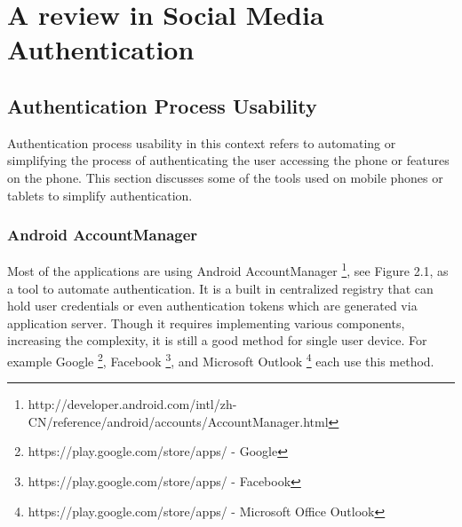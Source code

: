 
\chapter{A review in Social Media Authentication} %

\ifpdf
    \graphicspath{{X/figures/PNG/}{X/figures/PDF/}{X/figures/}}
\else
    \graphicspath{{X/figures/EPS/}{X/figures/}}
\fi



\section{Authentication Process Usability}
Authentication process usability in this context refers to automating or simplifying the process of authenticating the user accessing the phone or features on the phone. This section discusses some of the tools used on mobile phones or tablets to simplify authentication.

\subsection{Android AccountManager}
Most of the applications are using Android AccountManager \footnote[4]{http://developer.android.com/intl/zh-CN/reference/android/accounts/AccountManager.html}, see Figure 2.1, as a tool to automate authentication. It is a built in centralized registry that can hold user credentials or even authentication tokens which are generated via application server. Though it requires implementing various components, increasing the complexity, it is still a good method for single user device. For example Google \footnote[5]{https://play.google.com/store/apps/ - Google}, Facebook \footnote[6]{https://play.google.com/store/apps/ - Facebook}, and Microsoft Outlook \footnote[7]{https://play.google.com/store/apps/ - Microsoft Office Outlook} each use this method. 


